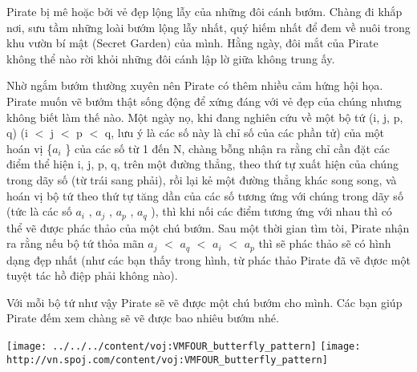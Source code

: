 Pirate bị mê hoặc bởi vẻ đẹp lộng lẫy của những đôi cánh bướm. Chàng đi khắp nơi, sưu tầm những loài bướm lộng lẫy nhất, quý hiếm nhất để đem về nuôi trong khu vườn bí mật (Secret Garden) của mình. Hằng ngày, đôi mắt của Pirate không thể nào rời khỏi những đôi cánh lập lờ giữa không trung ấy.

Nhờ ngắm bướm thường xuyên nên Pirate có thêm nhiều cảm hứng hội họa. Pirate muốn vẽ bướm thật sống động để xứng đáng với vẻ đẹp của chúng nhưng không biết làm thế nào. Một ngày nọ, khi đang nghiên cứu về một bộ tứ (i, j, p, q) (i $<$ j $<$ p $<$ q, lưu ý là các số này là chỉ số của các phần tử) của một hoán vị \{$a_{i}$ \} của các số từ 1 đến N, chàng bỗng nhận ra rằng chỉ cần đặt các điểm thể hiện i, j, p, q, trên một đường thẳng, theo thứ tự xuất hiện của chúng trong dãy số (từ trái sang phải), rồi lại kẻ một đường thẳng khác song song, và hoán vị bộ tứ theo thứ tự tăng dần của các số tương ứng với chúng trong dãy số (tức là các số $a_{i}$ , $a_{j}$ , $a_{p}$ , $a_{q}$ ), thì khi nối các điểm tương ứng với nhau thì có thể vẽ được phác thảo của một chú bướm. Sau một thời gian tìm tòi, Pirate nhận ra rằng nếu bộ tứ thỏa mãn $a_{j}$ $<$ $a_{q}$ $<$ $a_{i}$ $<$ $a_{p}$ thì sẽ phác thảo sẽ có hình dạng đẹp nhất (như các bạn thấy trong hình, từ phác thảo Pirate đã vẽ đựơc một tuyệt tác hồ điệp phải không nào).

Với mỗi bộ tứ như vậy Pirate sẽ vẽ được một chú bướm cho mình. Các bạn giúp Pirate đếm xem chàng sẽ vẽ được bao nhiêu bướm nhé.


\texttt{[image: ../../../content/voj:VMFOUR\_butterfly\_pattern]}
\texttt{[image: http://vn.spoj.com/content/voj:VMFOUR\_butterfly\_pattern]}
\begin{itemize}
\end{itemize}